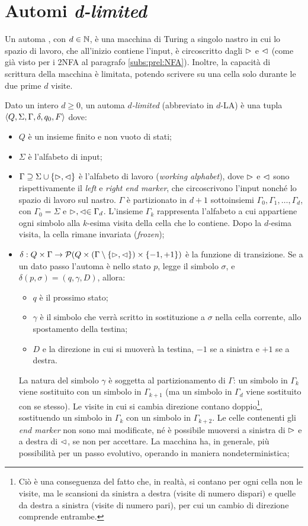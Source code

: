 \section{Automi \emph{d-limited}}
Un automa , con $d\in\mathbb N$, è una macchina di Turing a singolo nastro in cui lo spazio di lavoro, che all'inizio contiene l'input, è circoscritto dagli  $\vartriangleright$ e $\vartriangleleft$ (come già visto per i 2NFA al paragrafo \ref{subs:prel:NFA}). Inoltre, la capacità di scrittura della macchina è limitata, potendo scrivere su una cella solo durante le due prime $d$ visite.
\begin{defin}
	Dato un intero $d\geq 0$, un automa \emph{$d$-limited} (abbreviato in $d$-LA) è una tupla $\langle Q,\Sigma,\Gamma,\delta,q_0,F \rangle$ dove:
	\begin{itemize}
		\item $Q$ è un insieme finito e non vuoto di stati;
		\item $\Sigma$ è l'alfabeto di input;
		\item $\Gamma\supseteq\Sigma\cup\left\{ \vartriangleright,\vartriangleleft \right\}$ è l'alfabeto di lavoro (\emph{working alphabet}), dove $\vartriangleright$ e $\vartriangleleft$ sono rispettivamente il \emph{left} e \emph{right end marker}, che circoscrivono l'input nonché lo spazio di lavoro sul nastro. $\Gamma$ è partizionato in $d+1$ sottoinsiemi $\Gamma_0,\Gamma_1,\dots,\Gamma_d$, con $\Gamma_0=\Sigma$ e $\vartriangleright,\vartriangleleft\in\Gamma_d$. L'insieme $\Gamma_k$ rappresenta l'alfabeto a cui appartiene ogni simbolo alla $k$-esima visita della cella che lo contiene. Dopo la $d$-esima visita, la cella rimane invariata (\emph{frozen});
		\item $\delta:Q\times\Gamma\to \mathcal P(Q\times(\Gamma\setminus\left\{ \vartriangleright,\vartriangleleft \right\})\times\left\{ -1,+1 \right\})$ è la funzione di transizione. Se a un dato passo l'automa è nello stato $p$, legge il simbolo $\sigma$, e $\delta(p,\sigma)=(q,\gamma,D)$, allora:
		      \begin{itemize}
			      \item $q$ è il prossimo stato;
			      \item $\gamma$ è il simbolo che verrà scritto in sostituzione a $\sigma$ nella cella corrente, allo spostamento della testina;
			      \item $D$ e la direzione in cui si muoverà la testina, $-1$ se a sinistra e $+1$ se a destra.
		      \end{itemize}
		      La natura del simbolo $\gamma$ è soggetta al partizionamento di $\Gamma$: un simbolo in $\Gamma_k$ viene sostituito con un simbolo in $\Gamma_{k+1}$ (ma un simbolo in $\Gamma_d$ viene sostituito con se stesso). Le visite in cui si cambia direzione contano doppio\footnote{Ciò è una conseguenza del fatto che, in realtà, si contano per ogni cella non le visite, ma le scansioni da sinistra a destra (visite di numero dispari) e quelle da destra a sinistra (visite di numero pari), per cui un cambio di direzione comprende entrambe.}, sostituendo un simbolo in $\Gamma_k$ con un simbolo in $\Gamma_{k+2}$. Le celle contenenti gli \emph{end marker} non sono mai modificate, né è possibile muoversi a sinistra di $\vartriangleright$ e a destra di $\vartriangleleft$, se non per accettare. La macchina ha, in generale, più possibilità per un passo evolutivo, operando in maniera nondeterministica;

\end{itemize}
\end{defin}
